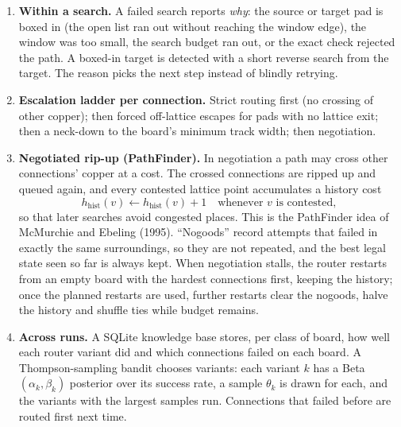 \documentclass[10pt,a4paper]{article}
\begin{document}
\begin{enumerate}[leftmargin=*]
  \item \textbf{Within a search.} A failed search reports \emph{why}: the source or target pad is boxed in (the
  open list ran out without reaching the window edge), the window was too small, the search budget ran out, or
  the exact check rejected the path. A boxed-in target is detected with a short reverse search from the target.
  The reason picks the next step instead of blindly retrying.
  \item \textbf{Escalation ladder per connection.} Strict routing first (no crossing of other copper); then forced
  off-lattice escapes for pads with no lattice exit; then a neck-down to the board's minimum track width; then
  negotiation.
  \item \textbf{Negotiated rip-up (PathFinder).} In negotiation a path may cross other connections' copper at a cost.
  The crossed connections are ripped up and queued again, and every contested lattice point accumulates a history
  cost
  \begin{equation}
    h_\text{hist}(v) \leftarrow h_\text{hist}(v) + 1 \quad\text{whenever } v \text{ is contested},
  \end{equation}
  so that later searches avoid congested places. This is the PathFinder idea of McMurchie and Ebeling (1995).
  ``Nogoods'' record attempts that failed in exactly the same surroundings, so they are not repeated, and the best
  legal state seen so far is always kept. When negotiation stalls, the router restarts from an empty board with
  the hardest connections first, keeping the history; once the planned restarts are used, further restarts clear
  the nogoods, halve the history and shuffle ties while budget remains.
  \item \textbf{Across runs.} A SQLite knowledge base stores, per class of board, how well each router variant did
  and which connections failed on each board. A Thompson-sampling bandit chooses variants: each variant $k$ has a
  Beta$(\alpha_k,\beta_k)$ posterior over its success rate, a sample $\theta_k$ is drawn for each, and the variants
  with the largest samples run. Connections that failed before are routed first next time.
\end{enumerate}
\end{document}
